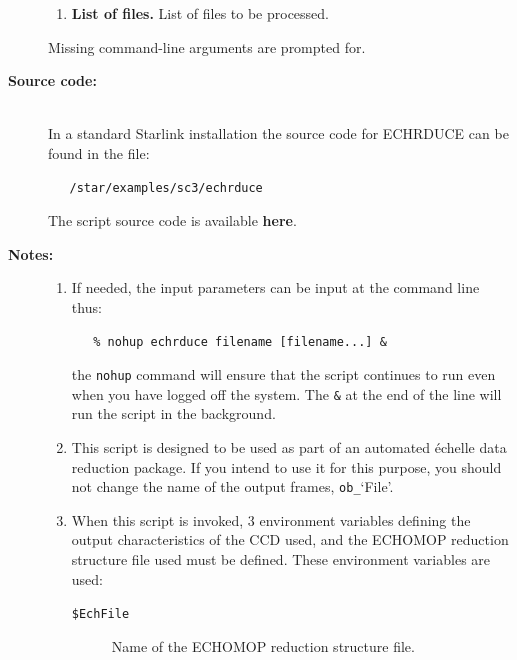 \documentclass[twoside,11pt]{article}
\newcommand{\htmlref}[2]{#1}
\newenvironment{latexonly}{}{}
\renewcommand{\_}{\texttt{\symbol{95}}}
\begin{document}
\begin{description}
\begin{enumerate}
\item {\bf List of files.}
      List of files to be processed.

\end{enumerate}

     Missing command-line arguments are prompted for.

\item [{\bf Source code:}] \mbox{} \\
\begin{latexonly}
In a standard Starlink installation the source code for ECHRDUCE can be found
in the file:
\begin{verbatim}
   /star/examples/sc3/echrduce
\end{verbatim}
\end{latexonly}
\begin{htmlonly}
      The script source code is available
      \htmlref{{\bf here}}{se_echrduce_source}.
\end{htmlonly}

\item [{\bf Notes:}] \mbox{}
\begin{enumerate}

\item If needed, the input parameters can be input at the command
      line thus:

\begin{verbatim}
   % nohup echrduce filename [filename...] &
\end{verbatim}

      the \verb+nohup+ command will ensure that the script continues
      to run even when you have logged off the system.  The \verb+&+ at
      the end of the line will run the script in the background.

\item This script is designed to be used as part of an automated
      \'{e}chelle data reduction package.  If you intend to use it
      for this purpose, you should not change the name of the output
      frames, \verb+ob_+`File'.

\item When this script is invoked, 3 environment variables defining
      the output characteristics of the CCD used, and the ECHOMOP
      reduction structure file used must be defined.
      These environment variables are used:

\begin{description}

\item [{\tt{\$EchFile}}]
      Name of the ECHOMOP reduction structure file.


\end{description}
\end{enumerate}
\end{description}
\end{document}
